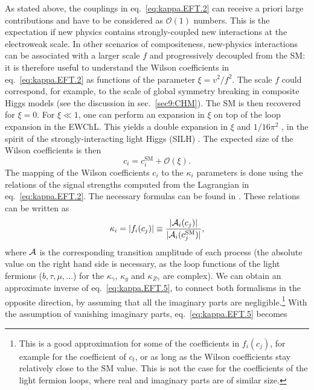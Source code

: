 As stated above, the couplings in eq.~\eqref{eq:kappa.EFT.2} can receive a priori large contributions and have to be considered as $\mathcal{O}(1)$ numbers. This is the expectation if new physics contains strongly-coupled new interactions at the electroweak scale. In other scenarios of compositeness, new-physics interactions  can be associated with a larger scale $f$ and progressively decoupled from the SM: it is therefore useful to understand the Wilson coefficients in eq.~\eqref{eq:kappa.EFT.2} as functions of the parameter $\xi = v^{2}/f^{2}$. The scale $f$ could correspond, for example, to the scale of global symmetry breaking in composite Higgs models (see the discussion in sec.~\ref{sec9:CHM}). The SM is then recovered for $\xi=0$. For $\xi\ll 1$, one can perform an expansion in $\xi$ on top of the loop expansion in the EWChL. This yields a double expansion in $\xi$ and $1/16\pi^{2}$ \cite{Buchalla:2014eca}, in the spirit of the strongly-interacting light Higgs (SILH) \cite{Giudice:2007fh}. The expected size of the Wilson coefficients is then
\begin{equation}
  \label{eq:kappa.EFT.4}
    c_{i} =  c_{i}^{\text{SM}} + \mathcal{O}(\xi).
\end{equation}
The mapping of the Wilson coefficients $c_{i}$ to the $\kappa_{i}$ parameters is done using the relations of the signal strengths computed from the Lagrangian in eq.~\eqref{eq:kappa.EFT.2}. The necessary formulas can be found in \cite{Buchalla:2015qju,deBlas:2018tjm}. These relations can be written as
%
\begin{equation}
\label{eq:kappa.EFT.5}
  \kappa_{i} =  |f_i(c_{j})| \equiv \frac{|{\cal A}_i(c_{j})|}{|{\cal A}_i(c_{j}^{\text{SM}})|}, 
\end{equation}
%
where ${\cal A}$ is the corresponding transition amplitude of each process (the absolute value on the right hand side is necessary, as the loop functions of the light fermions ($b,\tau,\mu,\dots$) for the $\kappa_{\gamma}$, $\kappa_{g}$ and $\kappa_{Z\gamma}$ are complex).
We can  obtain an approximate inverse of eq.~\eqref{eq:kappa.EFT.5}, to connect both formalisms in the opposite direction, by assuming that all the imaginary parts are negligible.\footnote{This is a good approximation for some of the coefficients in $f_i(c_{j})$, for example for the coefficient of $c_{t}$, or as long as  the Wilson coefficients stay relatively close to the SM value. This is not the case for the coefficients of the light fermion loops, where real and imaginary parts are of similar size.}
With the assumption of vanishing imaginary parts, eq.~\eqref{eq:kappa.EFT.5} becomes
